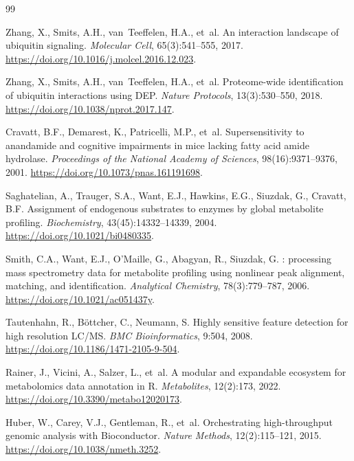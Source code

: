 \documentclass[11pt,twoside,openright]{book}
\begin{document}
\FloatBarrier
\begin{thebibliography}{99}

Zhang, X., Smits, A.H., van~Teeffelen, H.A., et~al.
\newblock An interaction landscape of ubiquitin signaling.
\newblock \emph{Molecular Cell}, 65(3):541--555, 2017.
\newblock \url{https://doi.org/10.1016/j.molcel.2016.12.023}.

Zhang, X., Smits, A.H., van~Teeffelen, H.A., et~al.
\newblock Proteome-wide identification of ubiquitin interactions using {DEP}.
\newblock \emph{Nature Protocols}, 13(3):530--550, 2018.
\newblock \url{https://doi.org/10.1038/nprot.2017.147}.

Cravatt, B.F., Demarest, K., Patricelli, M.P., et~al.
\newblock Supersensitivity to anandamide and cognitive impairments in mice lacking fatty acid amide hydrolase.
\newblock \emph{Proceedings of the National Academy of Sciences}, 98(16):9371--9376, 2001.
\newblock \url{https://doi.org/10.1073/pnas.161191698}.

Saghatelian, A., Trauger, S.A., Want, E.J., Hawkins, E.G., Siuzdak, G., Cravatt, B.F.
\newblock Assignment of endogenous substrates to enzymes by global metabolite profiling.
\newblock \emph{Biochemistry}, 43(45):14332--14339, 2004.
\newblock \url{https://doi.org/10.1021/bi0480335}.

Smith, C.A., Want, E.J., O'Maille, G., Abagyan, R., Siuzdak, G.
: processing mass spectrometry data for metabolite profiling using nonlinear peak alignment, matching, and identification.
\newblock \emph{Analytical Chemistry}, 78(3):779--787, 2006.
\newblock \url{https://doi.org/10.1021/ac051437y}.

Tautenhahn, R., B\"ottcher, C., Neumann, S.
\newblock Highly sensitive feature detection for high resolution {LC/MS}.
\newblock \emph{BMC Bioinformatics}, 9:504, 2008.
\newblock \url{https://doi.org/10.1186/1471-2105-9-504}.

Rainer, J., Vicini, A., Salzer, L., et~al.
\newblock A modular and expandable ecosystem for metabolomics data annotation in {R}.
\newblock \emph{Metabolites}, 12(2):173, 2022.
\newblock \url{https://doi.org/10.3390/metabo12020173}.

Huber, W., Carey, V.J., Gentleman, R., et~al.
\newblock Orchestrating high-throughput genomic analysis with {Bioconductor}.
\newblock \emph{Nature Methods}, 12(2):115--121, 2015.
\newblock \url{https://doi.org/10.1038/nmeth.3252}.


\end{thebibliography}
\end{document}
